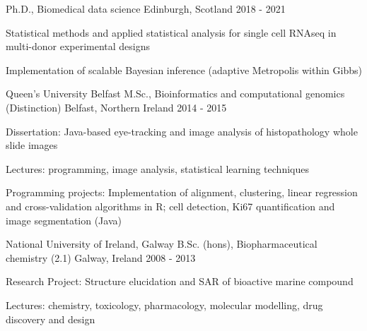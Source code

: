 


\begin{cventries}



 {
  Ph.D., Biomedical data science
} {
  Edinburgh, Scotland
} {
  2018 - 2021
} {
  \begin{cvitems}
    \item {
      Statistical methods and applied statistical analysis for single cell
      RNAseq in multi-donor experimental designs
    }
    \item {
      Implementation of scalable Bayesian inference (adaptive Metropolis 
      within Gibbs)
    }
  \end{cvitems}
}
\cventry
{Queen's University Belfast} %
{M.Sc., Bioinformatics and computational genomics (Distinction)} %
{Belfast, Northern Ireland} %
{2014 - 2015} %
{ %
\begin{cvitems}
\item {Dissertation: Java-based eye-tracking and image analysis of histopathology whole slide images}
\item {Lectures: programming, image analysis, statistical learning techniques}
\item {Programming projects: Implementation of alignment, clustering, linear regression  and cross-validation algorithms in R; cell detection, Ki67 quantification and
image segmentation (Java)}
\end{cvitems}
}
\cventry
{National University of Ireland, Galway} %
{B.Sc. (hons), Biopharmaceutical chemistry (2.1)} %
{Galway, Ireland} %
{2008 - 2013} %
{ %
\begin{cvitems}
\item {Research Project: Structure elucidation and SAR of bioactive marine compound}
\item {Lectures: chemistry, toxicology, pharmacology, molecular modelling,
drug discovery and design}
\end{cvitems}
}



\end{cventries}
